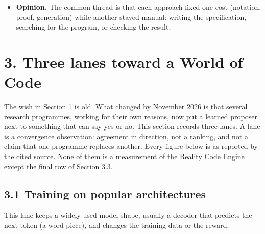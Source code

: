 \documentclass[10pt,letterpaper]{article}
\begin{document}
\begin{itemize}
  code that was then hand-edited, and the model and the code drifted
  apart. Petre reports from earlier surveys that ``the biggest perceived
  problem of model-centric approaches is keeping the model up-to-date
  with the code (68\% agreement)'' (Forward and Lethbridge, as reported
  by Petre, 2013, author copy p.~3); among Petre's own 50 informants, 35
  did not use UML (Unified Modeling Language) and 3 used automated code
  generation (pp.~4-5). Adoption studies of CASE and of model-driven
  engineering are listed in the ledger as not read, so no figures from
  them are quoted.
\item
  \textbf{Opinion.} The common thread is that each approach fixed one
  cost (notation, proof, generation) while another stayed manual:
  writing the specification, searching for the program, or checking the
  result.
\end{itemize}

\section{3. Three lanes toward a World of
Code}\label{three-lanes-toward-a-world-of-code}

The wish in Section 1 is old. What changed by November 2026 is that
several research programmes, working for their own reasons, now put a
learned proposer next to something that can say yes or no. This section
records three lanes. A lane is a convergence observation: agreement in
direction, not a ranking, and not a claim that one programme replaces
another. Every figure below is as reported by the cited source. None of
them is a measurement of the Reality Code Engine except the final row of
Section 3.3.

\subsection{3.1 Training on popular
architectures}\label{training-on-popular-architectures}

This lane keeps a widely used model shape, usually a decoder that
predicts the next token (a word piece), and changes the training data or
the reward.
\end{document}

